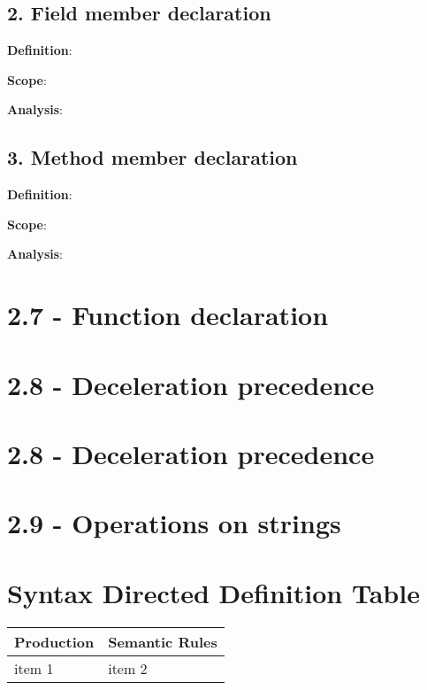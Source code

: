 \documentclass[11pt, oneside]{article}
\begin{document}
\subsection*{2. Field member declaration}
\par \textbf{Definition}: 
\par \textbf{Scope}: 
\par \textbf{Analysis}: 

\subsection*{3. Method member declaration}
\par \textbf{Definition}: 
\par \textbf{Scope}: 
\par \textbf{Analysis}: 

\section*{2.7 - Function declaration}
\par

\section*{2.8 - Deceleration precedence}
\par

\section*{2.8 - Deceleration precedence}
\par

\section*{2.9 - Operations on strings}
\par

\section*{Syntax Directed Definition Table}

\begin{tabularx}{\textwidth}{ |X|X| }
  \hline
  \textbf{Production} & \textbf{Semantic Rules} \\
  \hline
  item 1  & item 2 \\
  \hline
\end{tabularx}
\end{document}

